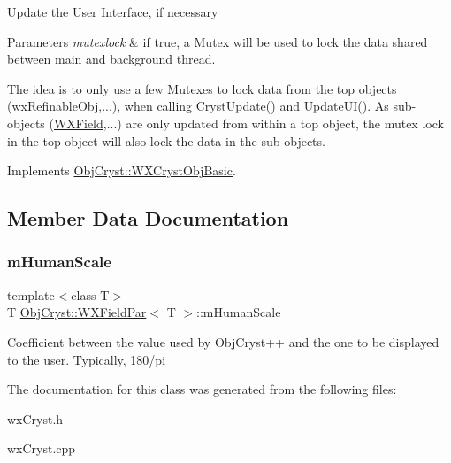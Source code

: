 Update the User Interface, if necessary


\begin{DoxyParams}{Parameters}
{\em mutexlock} & if true, a Mutex will be used to lock the data shared between main and background thread.\\
\hline
\end{DoxyParams}
The idea is to only use a few Mutexes to lock data from the top objects (wx\+Refinable\+Obj,...), when calling \mbox{\hyperlink{class_obj_cryst_1_1_w_x_field_par_a9cee56b1dc7a9695535c7461be7d9e5f}{Cryst\+Update()}} and \mbox{\hyperlink{class_obj_cryst_1_1_w_x_field_par_a1777f9713ca5d40c29c5bd3ab5484aff}{Update\+U\+I()}}. As sub-\/objects (\mbox{\hyperlink{class_obj_cryst_1_1_w_x_field}{W\+X\+Field}},...) are only updated from within a top object, the mutex lock in the top object will also lock the data in the sub-\/objects. 

Implements \mbox{\hyperlink{class_obj_cryst_1_1_w_x_cryst_obj_basic_a3818940b7031ff7e45cf2178c4a99c90}{Obj\+Cryst\+::\+W\+X\+Cryst\+Obj\+Basic}}.



\subsection{Member Data Documentation}
\mbox{\label{class_obj_cryst_1_1_w_x_field_par_aa37ca90ca40304e967b232e3eef4af12}} 
\subsubsection{\texorpdfstring{mHumanScale}{mHumanScale}}
{\footnotesize\ttfamily template$<$class T$>$ \\
T \mbox{\hyperlink{class_obj_cryst_1_1_w_x_field_par}{Obj\+Cryst\+::\+W\+X\+Field\+Par}}$<$ T $>$\+::m\+Human\+Scale\hspace{0.3cm}{\ttfamily [protected]}}

Coefficient between the value used by Obj\+Cryst++ and the one to be displayed to the user. Typically, 180/pi 

The documentation for this class was generated from the following files\+:\begin{DoxyCompactItemize}
\item 
wx\+Cryst.\+h\item 
wx\+Cryst.\+cpp\end{DoxyCompactItemize}
